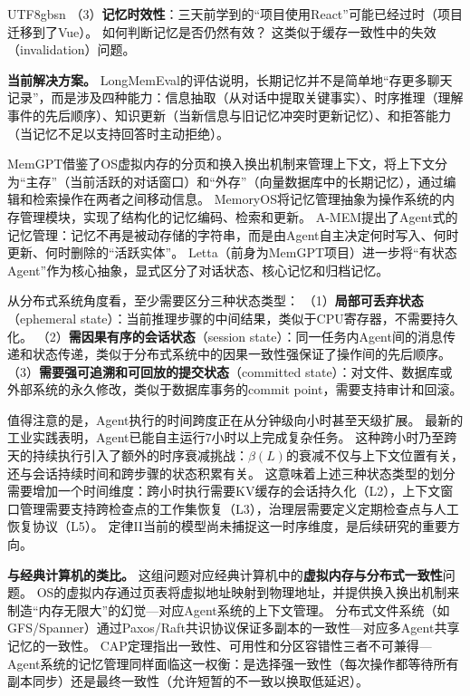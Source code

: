 \documentclass[11pt,a4paper]{article}
\begin{document}
\begin{CJK*}{UTF8}{gbsn}
（3）\textbf{记忆时效性}：三天前学到的``项目使用React''可能已经过时（项目迁移到了Vue）。
如何判断记忆是否仍然有效？
这类似于缓存一致性中的失效（invalidation）问题。

\textbf{当前解决方案。}
LongMemEval\cite{longmemeval2024}的评估说明，长期记忆并不是简单地``存更多聊天记录''，而是涉及四种能力：信息抽取（从对话中提取关键事实）、时序推理（理解事件的先后顺序）、知识更新（当新信息与旧记忆冲突时更新记忆）、和拒答能力（当记忆不足以支持回答时主动拒绝）。

MemGPT\cite{memgpt2023}借鉴了OS虚拟内存的分页和换入换出机制来管理上下文，将上下文分为``主存''（当前活跃的对话窗口）和``外存''（向量数据库中的长期记忆），通过编辑和检索操作在两者之间移动信息。
MemoryOS\cite{memoryos2025}将记忆管理抽象为操作系统的内存管理模块，实现了结构化的记忆编码、检索和更新。
A-MEM\cite{amem2025}提出了Agent式的记忆管理：记忆不再是被动存储的字符串，而是由Agent自主决定何时写入、何时更新、何时删除的``活跃实体''。
Letta\cite{letta_stateful_2026}（前身为MemGPT项目）进一步将``有状态Agent''作为核心抽象，显式区分了对话状态、核心记忆和归档记忆。

从分布式系统角度看，至少需要区分三种状态类型\cite{raft2014,spanner2012,cap2002}：
（1）\textbf{局部可丢弃状态}（ephemeral state）：当前推理步骤的中间结果，类似于CPU寄存器，不需要持久化。
（2）\textbf{需因果有序的会话状态}（session state）：同一任务内Agent间的消息传递和状态传递，类似于分布式系统中的因果一致性强保证了操作间的先后顺序\cite{raft2014}。
（3）\textbf{需要强可追溯和可回放的提交状态}（committed state）：对文件、数据库或外部系统的永久修改，类似于数据库事务的commit point，需要支持审计和回滚\cite{spanner2012}。

值得注意的是，Agent执行的时间跨度正在从分钟级向小时甚至天级扩展。
最新的工业实践表明，Agent已能自主运行7小时以上完成复杂任务\cite{anthropic2026agenticreport}。
这种跨小时乃至跨天的持续执行引入了额外的时序衰减挑战：$\beta(L)$的衰减不仅与上下文位置有关，还与会话持续时间和跨步骤的状态积累有关。
这意味着上述三种状态类型的划分需要增加一个时间维度：跨小时执行需要KV缓存的会话持久化（L2），上下文窗口管理需要支持跨检查点的工作集恢复（L3），治理层需要定义定期检查点与人工恢复协议（L5）。
定律II当前的模型尚未捕捉这一时序维度，是后续研究的重要方向。

\textbf{与经典计算机的类比。}
这组问题对应经典计算机中的\textbf{虚拟内存与分布式一致性}问题。
OS的虚拟内存通过页表将虚拟地址映射到物理地址，并提供换入换出机制来制造``内存无限大''的幻觉---对应Agent系统的上下文管理。
分布式文件系统（如GFS/Spanner\cite{spanner2012}）通过Paxos/Raft\cite{raft2014}共识协议保证多副本的一致性---对应多Agent共享记忆的一致性。
CAP定理\cite{cap2002}指出一致性、可用性和分区容错性三者不可兼得---Agent系统的记忆管理同样面临这一权衡：是选择强一致性（每次操作都等待所有副本同步）还是最终一致性（允许短暂的不一致以换取低延迟）。


\end{CJK*}
\end{document}

